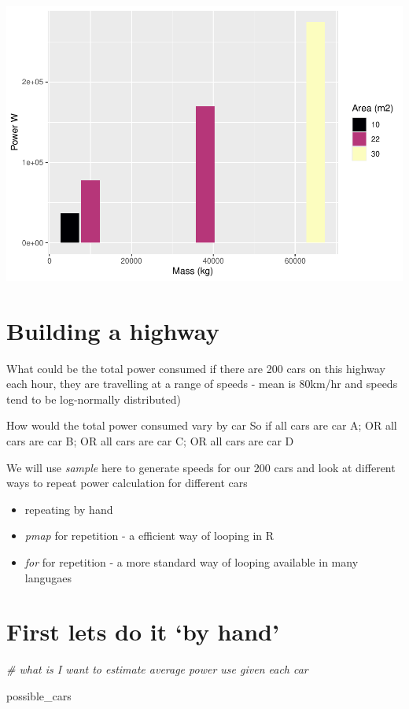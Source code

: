 \documentclass[
]{article}
\newenvironment{Shaded}{\begin{snugshade}}{\end{snugshade}}
\newcommand{\CommentTok}[1]{\textcolor[rgb]{0.56,0.35,0.01}{\textit{#1}}}
\newcommand{\NormalTok}[1]{#1}
\providecommand{\tightlist}{%
  \setlength{\itemsep}{0pt}\setlength{\parskip}{0pt}}
\begin{document}
\includegraphics{looping_HW4_files/figure-latex/sampling2-1.pdf}

\section{Building a highway}\label{building-a-highway}

What could be the total power consumed if there are 200 cars on this
highway each hour, they are travelling at a range of speeds - mean is
80km/hr and speeds tend to be log-normally distributed)

How would the total power consumed vary by car So if all cars are car A;
OR all cars are car B; OR all cars are car C; OR all cars are car D

We will use \emph{sample} here to generate speeds for our 200 cars and
look at different ways to repeat power calculation for different cars

\begin{itemize}
\tightlist
\item
  repeating by hand
\item
  \emph{pmap} for repetition - a efficient way of looping in R
\item
  \emph{for} for repetition - a more standard way of looping available
  in many langugaes
\end{itemize}

\section{First lets do it `by hand'}\label{first-lets-do-it-by-hand}

\begin{Shaded}
\begin{Highlighting}[]
\CommentTok{\# what is I want to estimate average power use given  each car}

\NormalTok{possible\_cars}
\end{Highlighting}
\end{Shaded}
\end{document}
